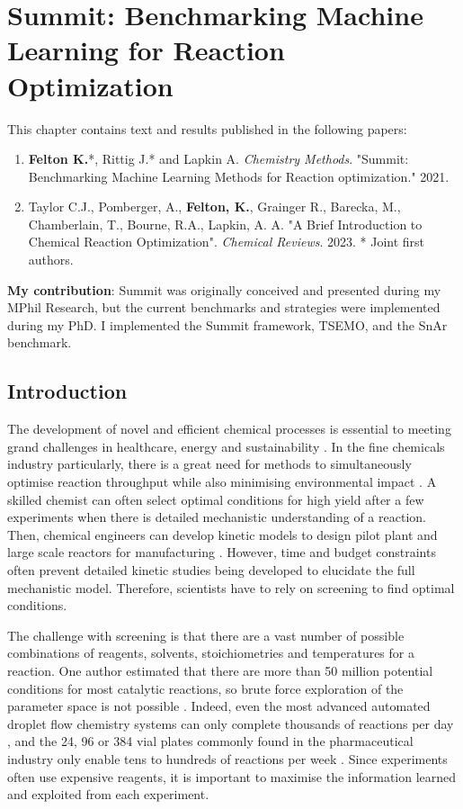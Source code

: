 \chapter{Summit: Benchmarking Machine Learning for Reaction Optimization}\label{ch:summit}

This chapter contains text and results published in the following papers:

\begin{enumerate}
\item \textbf{Felton K.}*, Rittig J.* and Lapkin A. \textit{Chemistry Methods}. "Summit: Benchmarking Machine Learning Methods for Reaction optimization." 2021.
\item Taylor C.J., Pomberger, A., \textbf{Felton, K.}, Grainger R., Barecka, M., Chamberlain, T., Bourne, R.A., Lapkin, A. A. "A Brief Introduction to Chemical Reaction Optimization". \textit{Chemical Reviews}. 2023.
* Joint first authors.
\end{enumerate}
\textbf{My contribution}: Summit was originally conceived and presented during my MPhil Research, but the current benchmarks and strategies were implemented during my PhD. I implemented the Summit framework, TSEMO, and the SnAr benchmark.


\section{Introduction}
The development of novel and efficient chemical processes is essential to meeting grand challenges in healthcare, energy and sustainability \cite{Sheldon2018,Rogers2019}. In the fine chemicals industry particularly, there is a great need for methods to simultaneously optimise reaction throughput while also minimising environmental impact \cite{Schweidtmann2018}. A skilled chemist can often select optimal conditions for high yield after a few experiments when there is detailed mechanistic understanding of a reaction. Then, chemical engineers can develop kinetic models to design pilot plant and large scale reactors for manufacturing \cite{Roberts2008}. However, time and budget constraints often prevent detailed kinetic studies being developed to elucidate the full mechanistic model. Therefore, scientists have to rely on screening to find optimal conditions. 

The challenge with screening is that there are a vast number of possible combinations of reagents, solvents, stoichiometries and temperatures for a reaction. One author estimated that there are more than 50 million potential conditions for most catalytic reactions, so brute force exploration of the parameter space is not possible \cite{Murray2013}. Indeed, even the most advanced automated droplet flow chemistry systems can only complete thousands of reactions per day \cite{Perera2018}, and the 24, 96 or 384 vial plates commonly found in the pharmaceutical industry only enable tens to hundreds of reactions per week \cite{BuitragoSantanilla2015, Shevlin2017, Mennen2019}. Since experiments often use expensive reagents, it is important to maximise the information learned and exploited from each experiment.

